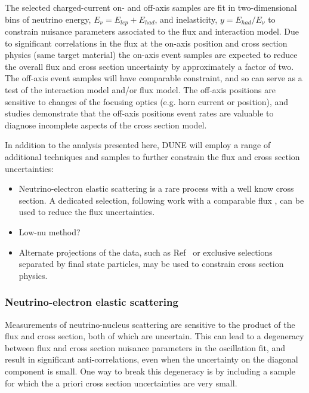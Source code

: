 The selected charged-current on- and off-axis samples are fit in two-dimensional bins of neutrino energy, $E_{\nu} = E_{lep} + E_{had}$, and inelasticity, $y = E_{had}/E_{\nu}$ to constrain nuisance parameters associated to the flux and interaction model. Due to significant correlations in the flux at the on-axis position and  cross section physics (same target material) the on-axis event samples are expected to reduce the overall flux and cross section uncertainty by approximately a factor of two. The off-axis event samples will have comparable constraint, and so can serve as a test of the interaction model and/or flux model. The off-axis positions are sensitive to changes of the focusing optics (e.g. horn current or position), and studies demonstrate that the off-axis positions event rates are valuable to diagnose incomplete aspects of the cross section model.

In addition to the analysis presented here, DUNE will employ a range of additional techniques and samples to further constrain the flux and cross section uncertainties: \begin{itemize}
\item Neutrino-electron elastic scattering is a rare process with a well know cross section. A dedicated selection, following work with a comparable flux%
, can be used to reduce the flux uncertainties.
\item Low-nu method?
\item Alternate projections of the data, such as Ref~%
or exclusive selections separated by final state particles, may be
 used to constrain cross section physics.
\end{itemize}

\subsubsection{Neutrino-electron elastic scattering}
\label{sec:nu+e}

Measurements of neutrino-nucleus scattering are sensitive to the product of the flux and cross section, both of which are uncertain. This can lead to a degeneracy between flux and cross section nuisance parameters in the oscillation fit, and result in significant anti-correlations, even when the uncertainty on the diagonal component is small. One way to break this degeneracy is by including a sample for which the a priori cross section uncertainties are very small. 

